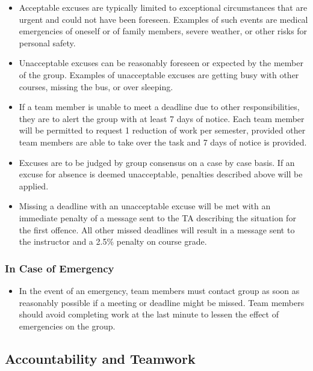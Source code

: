 \documentclass{article}
\begin{document}
\begin{itemize}
\begin{itemize}
\item Acceptable excuses are typically limited to exceptional circumstances that are urgent and could not have been foreseen. Examples of such events are medical emergencies of oneself or of family members, 
severe weather, or other risks for personal safety.
\item Unacceptable excuses can be reasonably foreseen or expected by the member of the group. Examples of unacceptable excuses are getting busy with other courses, missing the bus, or over sleeping.
\item If a team member is unable to meet a deadline due to other responsibilities, they are to alert the group with at least 7 days of notice. Each team member will
be permitted to request 1 reduction of work per semester, provided other team members are able to take over the task and 7 days of notice is provided.
\item Excuses are to be judged by group consensus on a case by case basis. If an excuse for absence is deemed unacceptable, penalties described above will be applied.
\item Missing a deadline with an unacceptable excuse will be met with an immediate penalty of a message sent to the TA describing the situation for the first offence. 
All other missed deadlines will result in a message sent to the instructor and a 2.5\% penalty on course grade.
\end{itemize}

\subsubsection*{In Case of Emergency}
\begin{itemize}
  \item In the event of an emergency, team members must contact group as soon as reasonably possible if a meeting or deadline might be missed. Team members should avoid
  completing work at the last minute to lessen the effect of emergencies on the group.
  \end{itemize}

\subsection*{Accountability and Teamwork}


\end{itemize}
\end{document}
